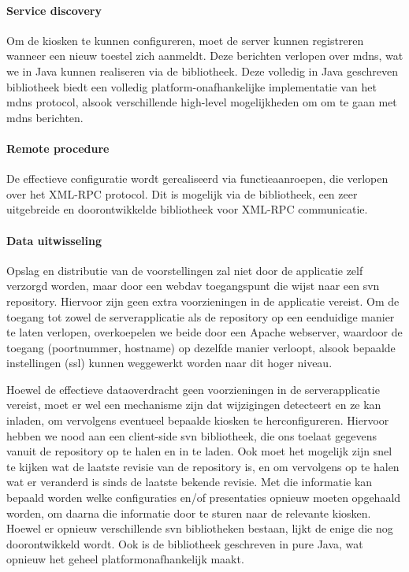 \paragraph{Service discovery} Om de kiosken te kunnen configureren, moet de server kunnen registreren wanneer een nieuw toestel zich aanmeldt. Deze berichten verlopen over \ac{mdns}, wat we in Java kunnen realiseren via de  bibliotheek. Deze volledig in Java geschreven bibliotheek biedt een volledig platform-onafhankelijke implementatie van het \ac{mdns} protocol, alsook verschillende high-level mogelijkheden om om te gaan met \ac{mdns} berichten.

\paragraph{Remote procedure} De effectieve configuratie wordt gerealiseerd via functieaanroepen, die verlopen over het XML-RPC protocol. Dit is mogelijk via de  bibliotheek, een zeer uitgebreide en doorontwikkelde bibliotheek voor XML-RPC communicatie.

\paragraph{Data uitwisseling} Opslag en distributie van de voorstellingen zal niet door de applicatie zelf verzorgd worden, maar door een \ac{webdav} toegangspunt die wijst naar een \ac{svn} repository. Hiervoor zijn geen extra voorzieningen in de applicatie vereist. Om de toegang tot zowel de serverapplicatie als de repository op een eenduidige manier te laten verlopen, overkoepelen we beide door een Apache webserver, waardoor de toegang (poortnummer, hostname) op dezelfde manier verloopt, alsook bepaalde instellingen (\ac{ssl}) kunnen weggewerkt worden naar dit hoger niveau.

Hoewel de effectieve dataoverdracht geen voorzieningen in de serverapplicatie vereist, moet er wel een mechanisme zijn dat wijzigingen detecteert en ze kan inladen, om vervolgens eventueel bepaalde kiosken te herconfigureren. Hiervoor hebben we nood aan een client-side \ac{svn} bibliotheek, die ons toelaat gegevens vanuit de repository op te halen en in te laden. Ook moet het mogelijk zijn snel te kijken wat de laatste revisie van de repository is, en om vervolgens op te halen wat er veranderd is sinds de laatste bekende revisie. Met die informatie kan bepaald worden welke configuraties en/of presentaties opnieuw moeten opgehaald worden, om daarna die informatie door te sturen naar de relevante kiosken.
Hoewel er opnieuw verschillende \ac{svn} bibliotheken bestaan, lijkt  de enige die nog doorontwikkeld wordt. Ook is de bibliotheek geschreven in pure Java, wat opnieuw het geheel platformonafhankelijk maakt.


